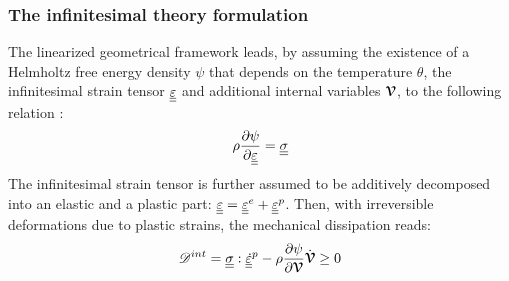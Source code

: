 \subsubsection*{The infinitesimal theory formulation}

The linearized geometrical framework leads, by assuming the existence of a Helmholtz free energy density $\psi$ that depends on the temperature $\theta$, the infinitesimal strain tensor ${\underline{\underline{\varepsilon}}}$ and additional internal variables ${\boldsymbol{\mathcal{V}}}$, to the following relation \cite[Ch.2]{Simo}:
\begin{equation}
  \label{eq:Cauchy_definition}
  \rho \frac{\partial \psi}{\partial {\underline{\underline{\varepsilon}}}} = {\underline{\underline{\sigma}}}
\end{equation}
The infinitesimal strain tensor is further assumed to be additively decomposed into an elastic and a plastic part: ${\underline{\underline{\varepsilon}}} = {\underline{\underline{\varepsilon}}}^e + {\underline{\underline{\varepsilon}}}^p$. Then, with irreversible deformations due to plastic strains, the mechanical dissipation reads:
\begin{equation}
  \label{eq:HPP_dissipation}
  \mathscr{D}^{int}={\underline{\underline{\sigma}}}:{\underline{\underline{\dot{\varepsilon}}}}^p -\rho \frac{\partial \psi}{\partial {\boldsymbol{\mathcal{V}}}}\dot{{\boldsymbol{\mathcal{V}}}} \geq 0
\end{equation}


